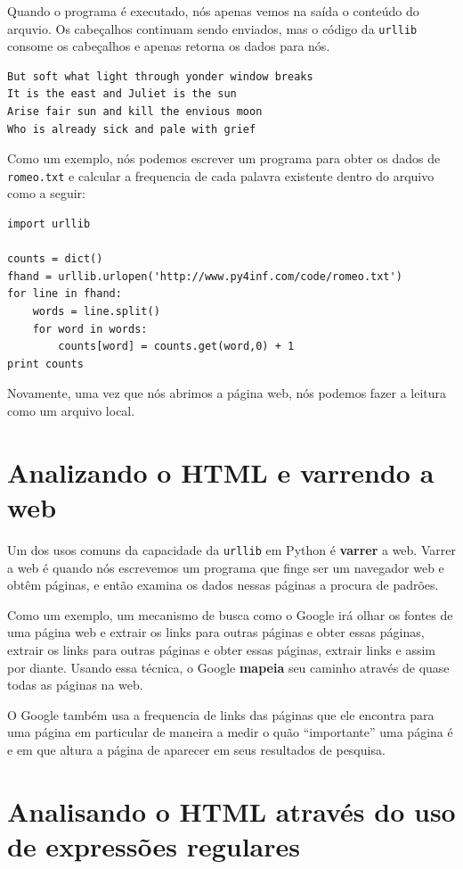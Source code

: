 Quando o programa é executado, nós apenas vemos na
saída o conteúdo do arquvio.   Os cabeçalhos
continuam sendo enviados, mas o código da {\tt urllib}
consome os cabeçalhos e apenas retorna os dados para
nós.

\beforeverb
\begin{verbatim}
But soft what light through yonder window breaks
It is the east and Juliet is the sun
Arise fair sun and kill the envious moon
Who is already sick and pale with grief
\end{verbatim}
\afterverb
%

Como um exemplo, nós podemos escrever 
um programa para obter os dados de
{\tt romeo.txt} e calcular a frequencia
de cada palavra existente dentro do arquivo como a seguir:

\beforeverb
\begin{verbatim}
import urllib

counts = dict()
fhand = urllib.urlopen('http://www.py4inf.com/code/romeo.txt')
for line in fhand:
    words = line.split()
    for word in words:
        counts[word] = counts.get(word,0) + 1   
print counts
\end{verbatim}
\afterverb
%
Novamente, uma vez que nós abrimos a página web, 
nós podemos fazer a leitura como um arquivo local.

\section{Analizando o HTML e varrendo a web}

Um dos usos comuns da capacidade da {\tt urllib} em Python é 
{\bf varrer} a web.   Varrer a web é quando nós escrevemos um programa
que finge ser um navegador web e obtêm páginas, e então examina os dados
nessas páginas a procura de padrões.

Como um exemplo, um mecanismo de busca como o Google irá olhar os fontes
de uma página web e extrair os links para outras páginas e obter
essas páginas, extrair os links para outras páginas e obter essas
páginas, extrair links e assim por diante.   Usando essa técnica,
o Google {\bf mapeia} seu caminho através de quase todas as páginas
na web.   

O Google também usa a frequencia de links das páginas que ele encontra
para uma página em particular de maneira a medir o quão ``importante'' 
uma página é e em que altura a página de aparecer em seus resultados de
pesquisa.

\section{Analisando o HTML através do uso de expressões regulares}

